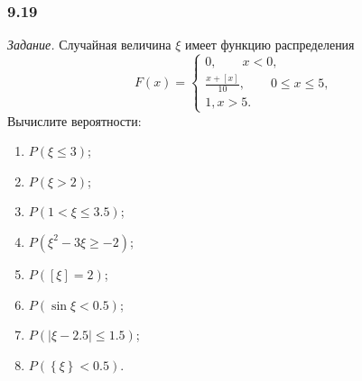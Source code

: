 \subsubsection*{9.19}

\textit{Задание.} Случайная величина $ \xi $ имеет функцию распределения
$$F \left( x \right) =
\begin{cases}
0, \qquad x < 0, \\
\frac{x + \left[ x \right] }{10}, \qquad 0 \leq x \leq 5, \\
1, x > 5.
\end{cases}$$
Вычислите вероятности:
\begin{enumerate}[label=\alph*)]
\item $P \left( \xi \leq 3 \right) $;
\item $P \left( \xi > 2 \right) $;
\item $P \left( 1 < \xi \leq 3.5 \right) $;
\item $P \left( \xi^2 - 3 \xi \geq -2 \right) $;
\item $P \left( \left[ \xi \right] = 2 \right) $;
\item $P \left( \sin \xi < 0.5 \right) $;
\item $P \left( \left| \xi - 2.5 \right| \leq 1.5 \right) $;
\item $P \left( \left\{ \xi \right\} < 0.5 \right) $.
\end{enumerate}


